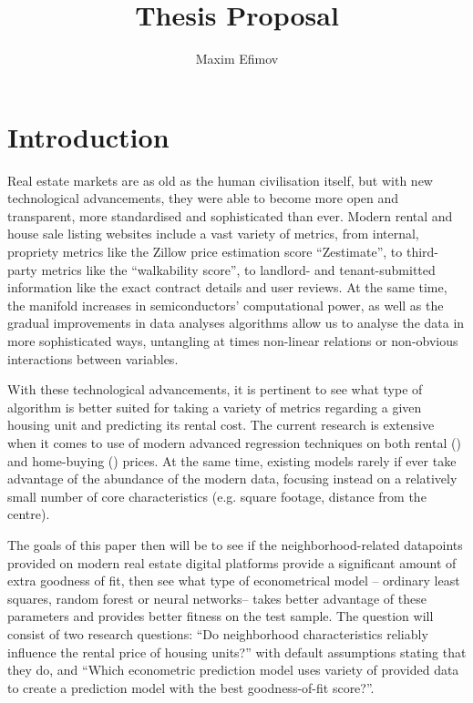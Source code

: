 \documentclass[12pt]{report}
\title{Thesis Proposal}
\author{Maxim Efimov}
\begin{document}
\maketitle

\section{Introduction}

Real estate markets are as old as the human civilisation itself, but with new technological advancements, they were able to become more open and transparent, more standardised and sophisticated than ever. Modern rental and house sale listing websites include a vast variety of metrics, from internal, propriety metrics like the Zillow price estimation score “Zestimate”, to third-party metrics like the “walkability score”, to landlord- and tenant-submitted information like the exact contract details and user reviews. At the same time, the manifold increases in semiconductors’ computational power, as well as the gradual improvements in data analyses algorithms allow us to analyse the data in more sophisticated ways, untangling at times non-linear relations or non-obvious interactions between variables. 

With these technological advancements, it is pertinent to see what type of algorithm is better suited for taking a variety of metrics regarding a given housing unit and predicting its rental cost. The current research is extensive when it comes to use of modern advanced regression techniques on both rental (\cite{neloy2019}) and home-buying (\cite{Shahhosseini2001}) prices. At the same time, existing models rarely if ever take advantage of the abundance of the modern data, focusing instead on a relatively small number of core characteristics (e.g. square footage, distance from the centre). 

The goals of this paper then will be to see if the neighborhood-related datapoints provided on modern real estate digital platforms provide a significant amount of extra goodness of fit, then see what type of econometrical model – ordinary least squares, random forest or neural networks– takes better advantage of these parameters and provides better fitness on the test sample. The question will consist of two research questions: “Do neighborhood characteristics reliably influence the rental price of housing units?”  with default assumptions stating that they do, and “Which econometric prediction model uses variety of provided data to create a prediction model with the best goodness-of-fit score?”. 
\end{document}
